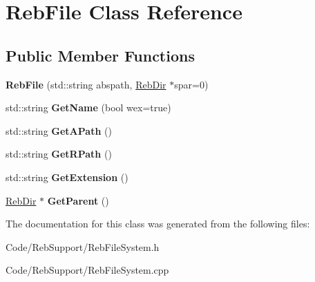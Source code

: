 \hypertarget{class_reb_file}{}\section{Reb\+File Class Reference}
\label{class_reb_file}
\subsection*{Public Member Functions}
\begin{DoxyCompactItemize}
\item 
{\bfseries Reb\+File} (std\+::string abspath, \hyperlink{class_reb_dir}{Reb\+Dir} $\ast$spar=0)\hypertarget{class_reb_file_a1f008b4a15ba4196acf03dc033003f83}{}\label{class_reb_file_a1f008b4a15ba4196acf03dc033003f83}

\item 
std\+::string {\bfseries Get\+Name} (bool wex=true)\hypertarget{class_reb_file_a1815f620a75028b52aec4751c7440c0f}{}\label{class_reb_file_a1815f620a75028b52aec4751c7440c0f}

\item 
std\+::string {\bfseries Get\+A\+Path} ()\hypertarget{class_reb_file_a15725b9679f08f3880370c149acf4f5a}{}\label{class_reb_file_a15725b9679f08f3880370c149acf4f5a}

\item 
std\+::string {\bfseries Get\+R\+Path} ()\hypertarget{class_reb_file_a249ac0c209407717c9f3650d9dfe08c8}{}\label{class_reb_file_a249ac0c209407717c9f3650d9dfe08c8}

\item 
std\+::string {\bfseries Get\+Extension} ()\hypertarget{class_reb_file_ad3dfa51debbbe1421bd4b29ba769d883}{}\label{class_reb_file_ad3dfa51debbbe1421bd4b29ba769d883}

\item 
\hyperlink{class_reb_dir}{Reb\+Dir} $\ast$ {\bfseries Get\+Parent} ()\hypertarget{class_reb_file_a5a035c1d22c88c4d00edf89a723c7d64}{}\label{class_reb_file_a5a035c1d22c88c4d00edf89a723c7d64}

\end{DoxyCompactItemize}


The documentation for this class was generated from the following files\+:\begin{DoxyCompactItemize}
\item 
Code/\+Reb\+Support/Reb\+File\+System.\+h\item 
Code/\+Reb\+Support/Reb\+File\+System.\+cpp\end{DoxyCompactItemize}
